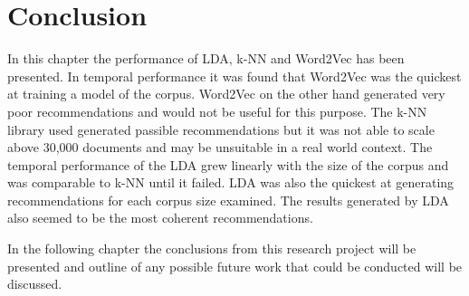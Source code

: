 \section{Conclusion}
In this chapter the performance of LDA, k-NN and Word2Vec has been presented.
In temporal performance it was found that Word2Vec was the quickest at training a model of the corpus.
Word2Vec on the other hand generated very poor recommendations and would not be useful for this purpose.
The k-NN library used generated passible recommendations but it was not able to scale above 30,000 documents and may be unsuitable in a real world context.
The temporal performance of the LDA grew linearly with the size of the corpus and was comparable to k-NN until it failed.
LDA was also the quickest at generating recommendations for each corpus size examined.
The results generated by LDA also seemed to be the most coherent recommendations.

In the following chapter the conclusions from this research project will be presented and outline of any possible future work that could be conducted will be discussed.
